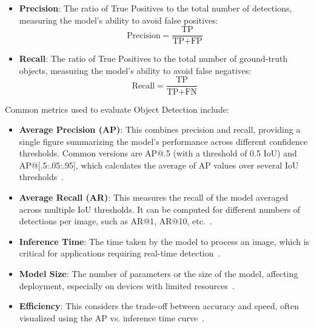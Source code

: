 \documentclass[12pt,oneside]{book} %
\begin{document}
\begin{itemize}
    \item \textbf{Precision}: The ratio of True Positives to the total number of
          detections, measuring the model's ability to avoid false positives:
          \begin{equation}
              \text{Precision} = \frac{\text{TP}}{\text{TP} + \text{FP}}
          \end{equation}

    \item \textbf{Recall}: The ratio of True Positives to the total number of ground-truth objects, measuring the model's ability to avoid false negatives:
          \begin{equation}
              \text{Recall} = \frac{\text{TP}}{\text{TP} + \text{FN}}
          \end{equation}
\end{itemize}

Common metrics used to evaluate Object Detection include:

\begin{itemize}
    \item \textbf{Average Precision (AP)}: This combines precision and recall, providing a single figure summarizing the model's performance across different confidence thresholds. Common versions are AP@.5 (with a threshold of 0.5 IoU) and AP@[.5:.05:.95], which calculates the average of AP values over several IoU thresholds~\cite{huggingface2023objectdetection}.
    \item \textbf{Average Recall (AR)}: This measures the recall of the model averaged across multiple IoU thresholds. It can be computed for different numbers of detections per image, such as AR@1, AR@10, etc.~\cite{huggingface2023objectdetection}.
    \item \textbf{Inference Time}: The time taken by the model to process an image, which is critical for applications requiring real-time detection~\cite{huggingface2023objectdetection}.
    \item \textbf{Model Size}: The number of parameters or the size of the model, affecting deployment, especially on devices with limited resources~\cite{huggingface2023objectdetection}.
    \item \textbf{Efficiency}: This considers the trade-off between accuracy and speed, often visualized using the AP vs. inference time curve~\cite{huggingface2023objectdetection}.
\end{itemize}
\end{document}
